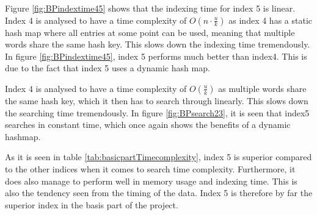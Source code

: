 Figure \ref{fig:BPindextime45} shows that the indexing time for index 5 is linear. Index 4 is analysed to have a time complexity of $O(n\cdot \frac{u}{k})$ as index 4 has a static hash map where all entries at some point can be used, meaning that multiple words share the same hash key. This slows down the indexing time tremendously. 
In figure \ref{fig:BPindextime45}, index 5 performs much better than index4. This is due to the fact that index 5 uses a dynamic hash map. 

 Index 4 is analysed to have a time complexity of $O(\frac{u}{k})$ as multiple words share the same hash key, which it then has to search through linearly. This slows down the searching time tremendously. In figure \ref{fig:BPsearch23}, it is seen that index5 searches in constant time, which once again shows the benefits of a dynamic hashmap.

 As it is seen in table \ref{tab:basicpartTimecomplexity}, index 5 is superior compared to the other indices when it comes to search time complexity. Furthermore, it does also manage to perform well in memory usage and indexing time. This is also the tendency seen from the timing of the data. Index 5 is therefore by far the superior index in the basis part of the project.  

